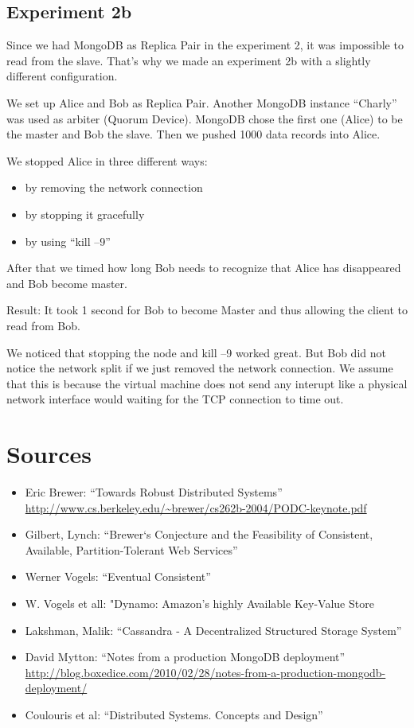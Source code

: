\subsection{Experiment 2b}

Since we had MongoDB as Replica Pair in the experiment 2, it was
impossible to read from the slave. That's why we made an experiment
2b with a slightly different configuration.

We set up Alice and Bob as Replica Pair. Another MongoDB instance
``Charly'' was used as arbiter (Quorum Device). MongoDB chose the
first one (Alice) to be the master and Bob the slave. Then we
pushed 1000 data records into Alice.

We stopped Alice in three different ways:

\begin{itemize}
\item
  by removing the network connection
\item
  by stopping it gracefully
\item
  by using ``kill --9''
\end{itemize}
After that we timed how long Bob needs to recognize that Alice has
disappeared and Bob become master.

Result: It took 1 second for Bob to become Master and thus allowing
the client to read from Bob.

We noticed that stopping the node and kill --9 worked great. But
Bob did not notice the network split if we just removed the network
connection. We assume that this is because the virtual machine does
not send any interupt like a physical network interface would
waiting for the TCP connection to time out.

\section{Sources}

\begin{itemize}
\item
  Eric Brewer: ``Towards Robust Distributed Systems''
  \url{http://www.cs.berkeley.edu/~brewer/cs262b-2004/PODC-keynote.pdf}
\item
  Gilbert, Lynch:
  ``Brewer‘s Conjecture and the Feasibility of Consistent, Available, Partition-Tolerant Web Services''
\item
  Werner Vogels: ``Eventual Consistent''
\item
  W. Vogels et all: "Dynamo: Amazon's highly Available Key-Value
  Store
\item
  Lakshman, Malik:
  ``Cassandra - A Decentralized Structured Storage System''
\item
  David Mytton: ``Notes from a production MongoDB deployment''
  \url{http://blog.boxedice.com/2010/02/28/notes-from-a-production-mongodb-deployment/}
\item
  Coulouris et al: ``Distributed Systems. Concepts and Design''
\end{itemize}